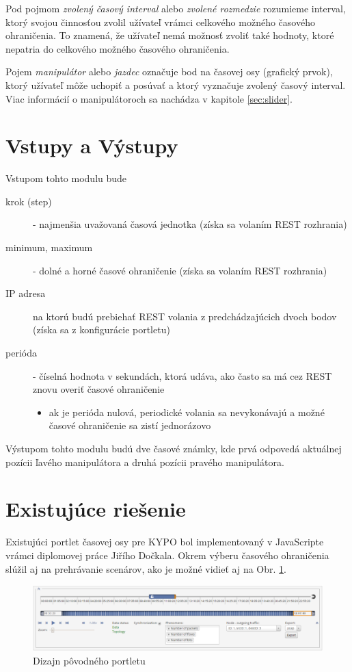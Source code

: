 \documentclass[
  digital, %
  twoside, %
  notable,   %
  nolof,   %
  nolot,   %
]{fithesis3}
\begin{document}
Pod pojmom \textit{zvolený časový interval} alebo \textit{zvolené rozmedzie} ro\-zu\-mie\-me interval, ktorý svojou činnosťou zvolil užívateľ vrámci celkového možného časového ohraničenia. To znamená, že užívateľ nemá možnosť zvoliť také hodnoty, ktoré nepatria do celkového možného časového ohraničenia.

Pojem \textit{manipulátor} alebo \textit{jazdec} označuje bod na časovej osy (grafický prvok), ktorý užívateľ môže uchopiť a posúvať a ktorý vyznačuje zvolený časový interval. Viac informácií o manipulátoroch sa nachádza v kapitole \ref{sec:slider}.

\section{Vstupy a Výstupy}
Vstupom tohto modulu bude
\begin{description}
\item[krok (step)] - najmenšia uvažovaná časová jednotka (získa sa volaním REST rozhrania)
\item[minimum, maximum] - dolné a horné časové ohraničenie (získa sa volaním REST rozhrania)
\item[IP adresa] na ktorú budú prebiehať REST volania z predchádzajúcich dvoch bodov (získa sa z konfigurácie portletu)
\item[perióda] - číselná hodnota v sekundách, ktorá udáva, ako často sa má cez REST znovu overiť časové ohraničenie
\begin{itemize}
\item ak je perióda nulová, periodické volania sa nevykonávajú a možné časové ohraničenie sa zistí jednorázovo
\end{itemize}
\end{description}
Výstupom tohto modulu budú dve časové známky, kde prvá odpovedá aktuálnej pozícii ľavého manipulátora a druhá pozícii pravého manipulátora.

\section{Existujúce riešenie}
Existujúci portlet časovej osy pre KYPO bol implementovaný v JavaScripte vrámci diplomovej práce Jiřího Dočkala\cite{dockal2016webovy}. Okrem výberu časového ohraničenia slúžil aj na prehrávanie scenárov, ako je možné vidieť aj na Obr. \ref{old_portlet}.

\begin{figure}[H]
	\center
	\includegraphics[width=1.0\linewidth]{old_portlet}
	\caption{Dizajn pôvodného portletu\cite{dockal2016webovy}}
	\label{old_portlet}
\end{figure}
\end{document}
